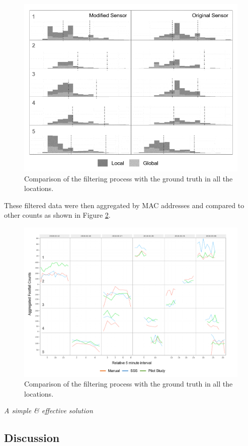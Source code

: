 \begin{figure}
  \includegraphics[trim={5 5 5 5}, clip]{images/processing-sss-signals.png}
  \caption{Comparison of the filtering process with the ground truth in all the locations.}
  \label{figure:processing:sss:signals}
\end{figure}

These filtered data were then aggregated by MAC addresses and compared to other counts as shown in Figure \ref{figure:processing:sss:comparison}. 

\begin{figure}
  \includegraphics[trim={10 10 33 10}, clip]{images/processing-sss-comparison.png}
  \caption{Comparison of the filtering process with the ground truth in all the locations.}
  \label{figure:processing:sss:comparison}
\end{figure}

\vspace{1.5em}\noindent\textit{A simple \& effective solution}\vspace{0.5em}

\subsection{Discussion}

